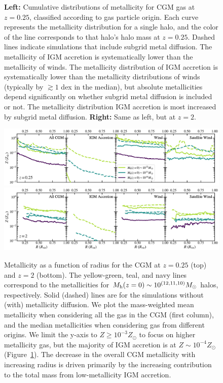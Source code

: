 \documentclass[fleqn,usenatbib]{mnras}
\begin{document}
\begin{figure}
\begin{minipage}{0.495\textwidth}
\end{minipage} \hfill
\caption{
\textbf{Left:}
Cumulative distributions of metallicity for CGM gas at $z=0.25$, classified according to gas particle origin.
Each curve represents the metallicity distribution for a single halo, and the color of the line corresponds to that halo's halo mass at $z=0.25$.
Dashed lines indicate simulations that include subgrid metal diffusion.
The metallicity of IGM accretion is systematically lower than the metallicity of winds. 
The metallicity distribution of IGM accretion is systematically lower than the metallicity distributions of winds (typically by $\gtrsim 1$ dex in the median), but absolute metallicities depend significantly on whether subgrid metal diffusion is included or not. 
The metallicity distribution IGM accretion is most increased by subgrid metal diffusion.
\textbf{Right:}
Same as left, but at $z=2$.
}
\label{fig:CGM_metallicity}
\end{figure}

\begin{figure}
\includegraphics[width=\textwidth]{figures/CGM_met_profile_snum465.pdf}
\includegraphics[width=\textwidth]{figures/CGM_met_profile_snum172.pdf}
\caption{
Metallicity as a function of radius for the CGM at $z=0.25$ (top) and $z=2$ (bottom).
The yellow-green, teal, and navy lines correspond to the metallicities for $M_{\rm h}(z=0) \sim 10^{(12,11,10)} M_\odot$ halos, respectively. 
Solid (dashed) lines are for the simulations without (with) metallicity diffusion. 
We plot the mass-weighted mean metallicity when considering all the gas in the CGM (first column), and the median metallicities when considering gas from different origins.
We limit the y-axis to $Z \geq 10^{-3} Z_\odot$ to focus on higher metallicity gas, but the majority of IGM accretion is at $Z\sim 10^{-4} Z_\odot$ (Figure~\ref{fig:CGM_metallicity}).
The decrease in the overall CGM metallicity with increasing radius is driven primarily by the increasing contribution to the total mass from low-metallicity IGM accretion.
}
\label{fig:CGM_met_profiles}
\end{figure}
\end{document}
